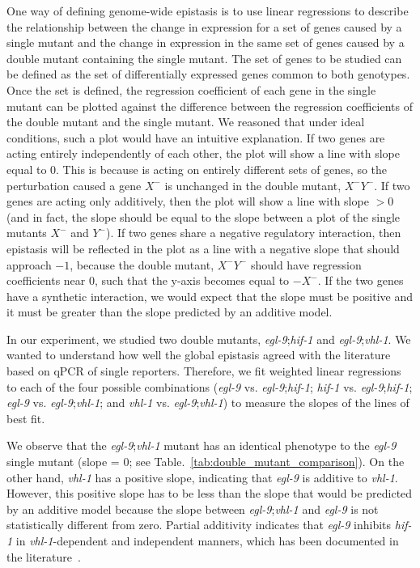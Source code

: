 \documentclass[9pt,twocolumn,twoside]{pnas-new}
\newcommand{\egl}{\emph{egl-9}}
\newcommand{\vhl}{\emph{vhl-1}}
\newcommand{\hif}{\emph{hif-1}}
\begin{document}
One way of defining genome-wide epistasis is to use linear regressions to describe
the relationship between the change in expression for a set of genes caused by a
single mutant and the change in expression in the same set of genes caused by a
double mutant containing the single mutant. The set of genes
to be studied can be defined as the set of differentially expressed genes common
to both genotypes.
Once the set is defined, the regression coefficient of each gene in the single
mutant can be plotted against the difference between the regression coefficients of
the double mutant and the single mutant. We reasoned that under ideal conditions,
such a plot would have an intuitive explanation. If two genes are acting
entirely independently of each other, the plot will show a line with slope equal
to 0. This is because is acting on entirely different sets of genes, so the
perturbation caused a gene $X^-$ is unchanged in the double mutant, $X^-Y^-$. If
two genes are acting only additively, then the plot will show a line with
slope $>0$ (and in fact, the slope should be equal to the slope between a plot of
the single mutants $X^-$ and $Y^-$). If two genes share a negative regulatory interaction,
then epistasis will be reflected in the plot as a line with a negative slope that
should approach $-1$, because
the double mutant, $X^-Y^-$ should have regression coefficients near 0, such that
the y-axis becomes equal to $-X^-$. If the two genes have a synthetic interaction,
we would expect that the slope must be positive and it must be greater than the
slope predicted by an additive model.

In our experiment, we studied two double mutants, \egl{};\hif{} and \egl{};\vhl{}.
We wanted to understand how well the global epistasis agreed with the literature
based on qPCR of single reporters. Therefore, we fit weighted linear regressions
to each of the four possible combinations (\egl{} vs. \egl{};\hif{};
\hif{} vs. \egl{};\hif{}; \egl{} vs. \egl{};\vhl{}; and \vhl{} vs. \egl{};\vhl{})
to measure the slopes of the lines of best fit.

We observe that the \egl{};\vhl{} mutant has an identical phenotype to the
\egl{} single mutant (slope = 0; see Table.~\ref{tab:double_mutant_comparison}).
On the other hand, \vhl{} has a positive slope, indicating that \egl{} is
additive to \vhl{}. However, this positive slope has to be less than the slope that
would be predicted by an additive model because the slope between \egl{};\vhl{} and
\egl{} is not statistically different from zero. Partial additivity indicates that
\egl{} inhibits \hif{} in \vhl{}-dependent and independent manners, which has
been documented in the literature~\cite{Shao2009}.
\end{document}
